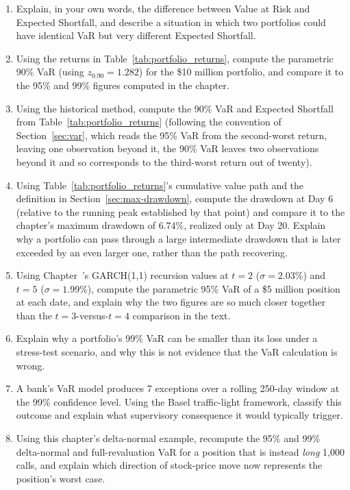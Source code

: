 \documentclass[../ai_in_finance]{subfiles}
\begin{document}
\begin{enumerate}[exercises]
    \item Explain, in your own words, the difference between Value at Risk and Expected Shortfall, and describe a situation in which two portfolios could have identical VaR but very different Expected Shortfall.
    \item Using the returns in Table~\ref{tab:portfolio_returns}, compute the parametric 90\% VaR (using $z_{0.90}=1.282$) for the \$10 million portfolio, and compare it to the 95\% and 99\% figures computed in the chapter.
    \item Using the historical method, compute the 90\% VaR and Expected Shortfall from Table~\ref{tab:portfolio_returns} (following the convention of Section~\ref{sec:var}, which reads the 95\% VaR from the second-worst return, leaving one observation beyond it, the 90\% VaR leaves two observations beyond it and so corresponds to the third-worst return out of twenty).
    \item Using Table~\ref{tab:portfolio_returns}'s cumulative value path and the definition in Section~\ref{sec:max-drawdown}, compute the drawdown at Day 6 (relative to the running peak established by that point) and compare it to the chapter's maximum drawdown of $6.74\%$, realized only at Day 20. Explain why a portfolio can pass through a large intermediate drawdown that is later exceeded by an even larger one, rather than the path recovering.
    \item Using Chapter~'s GARCH(1,1) recursion values at $t=2$ ($\sigma=2.03\%$) and $t=5$ ($\sigma=1.99\%$), compute the parametric 95\% VaR of a \$5 million position at each date, and explain why the two figures are so much closer together than the $t=3$-versus-$t=4$ comparison in the text.
    \item Explain why a portfolio's 99\% VaR can be smaller than its loss under a stress-test scenario, and why this is not evidence that the VaR calculation is wrong.
    \item A bank's VaR model produces 7 exceptions over a rolling 250-day window at the 99\% confidence level. Using the Basel traffic-light framework, classify this outcome and explain what supervisory consequence it would typically trigger.
    \item Using this chapter's delta-normal example, recompute the 95\% and 99\% delta-normal and full-revaluation VaR for a position that is instead \emph{long} 1,000 calls, and explain which direction of stock-price move now represents the position's worst case.

\end{enumerate}
\end{document}
